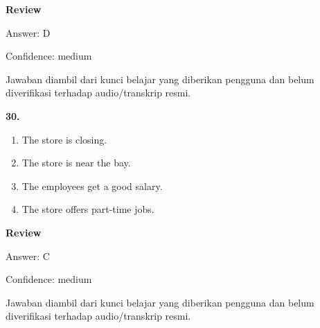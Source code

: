 \documentclass[12pt]{article}
\begin{document}
\par
\begingroup
\setlength{\parskip}{0pt}
\setlength{\parindent}{0pt}
\textbf{Review}\par
Answer: D\par
Confidence: medium\par
Jawaban diambil dari kunci belajar yang diberikan pengguna dan belum diverifikasi terhadap audio/transkrip resmi.\par
\endgroup
\par
\vspace{0.25\baselineskip}
\noindent\textbf{30.}
\begin{enumerate}[label=(\Alph*),leftmargin=*,itemsep=0.2em]
\item The store is closing.
\item The store is near the bay.
\item The employees get a good salary.
\item The store offers part-time jobs.
\end{enumerate}
\par
\begingroup
\setlength{\parskip}{0pt}
\setlength{\parindent}{0pt}
\textbf{Review}\par
Answer: C\par
Confidence: medium\par
Jawaban diambil dari kunci belajar yang diberikan pengguna dan belum diverifikasi terhadap audio/transkrip resmi.\par
\endgroup
\par
\vspace{0.25\baselineskip}
\end{document}

